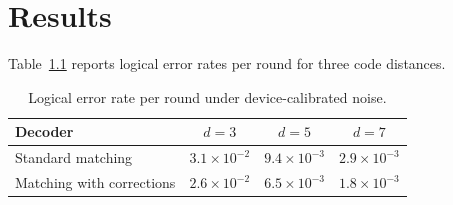 \chapter{Results}
\label{ch:results}

Table~\ref{tab:logical} reports logical error rates per round for three code distances.

\begin{table}[htbp]
  \centering
  \caption{Logical error rate per round under device-calibrated noise.}
  \label{tab:logical}
  \begin{tabular}{lccc}
    \toprule
    Decoder & $d=3$ & $d=5$ & $d=7$ \\
    \midrule
    Standard matching           & $3.1\times10^{-2}$ & $9.4\times10^{-3}$ & $2.9\times10^{-3}$ \\
    Matching with corrections   & $2.6\times10^{-2}$ & $6.5\times10^{-3}$ & $1.8\times10^{-3}$ \\
    \bottomrule
  \end{tabular}
\end{table}
